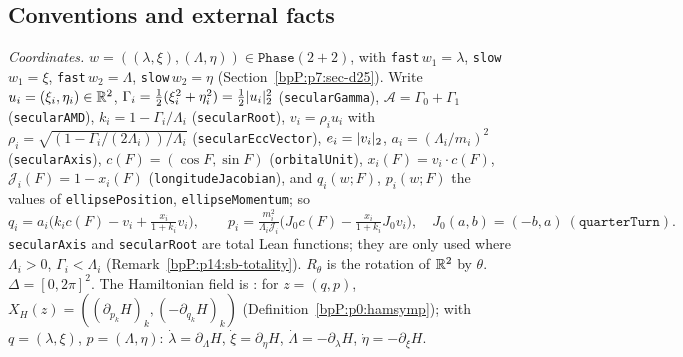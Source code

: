 \subsection{Conventions and external facts}\label{bpP:p14:sb-conv}

\emph{Coordinates.} $w=((\lambda,\xi),(\Lambda,\eta))\in\texttt{Phase}(2+2)$, with \texttt{fast}\,$w_1=\lambda$, \texttt{slow}\,$w_1=\xi$, \texttt{fast}\,$w_2=\Lambda$, \texttt{slow}\,$w_2=\eta$ (Section~\ref{bpP:p7:sec-d25}). Write
$u_i=(\xi_i,\eta_i)\in\mathbb{R}^2$, $\Gamma_i=\tfrac12(\xi_i^2+\eta_i^2)=\tfrac12\lvert u_i\rvert_2^2$ (\texttt{secularGamma}), $\mathcal A=\Gamma_0+\Gamma_1$ (\texttt{secularAMD}), $k_i=1-\Gamma_i/\Lambda_i$ (\texttt{secularRoot}),
$v_i=\rho_iu_i$ with $\rho_i=\sqrt{(1-\Gamma_i/(2\Lambda_i))/\Lambda_i}$ (\texttt{secularEccVector}), $e_i=\lvert v_i\rvert_2$, $a_i=(\Lambda_i/m_i)^2$ (\texttt{secularAxis}), $c(F)=(\cos F,\sin F)$ (\texttt{orbitalUnit}),
$x_i(F)=v_i\cdot c(F)$, $\mathcal J_i(F)=1-x_i(F)$ (\texttt{longitudeJacobian}), and $q_i(w;F)$, $p_i(w;F)$ the values of \texttt{ellipsePosition}, \texttt{ellipseMomentum}; so
\[q_i=a_i\bigl(k_ic(F)-v_i+\tfrac{x_i}{1+k_i}v_i\bigr),\qquad p_i=\tfrac{m_i^2}{\Lambda_i\mathcal J_i}\bigl(J_0c(F)-\tfrac{x_i}{1+k_i}J_0v_i\bigr),\quad J_0(a,b)=(-b,a)\ (\texttt{quarterTurn}).\]
\texttt{secularAxis} and \texttt{secularRoot} are total Lean functions; they are only used where $\Lambda_i>0$, $\Gamma_i<\Lambda_i$ (Remark~\ref{bpP:p14:sb-totality}). $R_\theta$ is the rotation of $\mathbb{R}^2$ by $\theta$.
$\Delta=[0,2\pi]^2$. The Hamiltonian field is : for $z=(q,p)$, $X_H(z)=((\partial_{p_k}H)_k,(-\partial_{q_k}H)_k)$ (Definition~\ref{bpP:p0:hamsymp}); with $q=(\lambda,\xi)$, $p=(\Lambda,\eta)$:
$\dot\lambda=\partial_\Lambda H$, $\dot\xi=\partial_\eta H$, $\dot\Lambda=-\partial_\lambda H$, $\dot\eta=-\partial_\xi H$.

